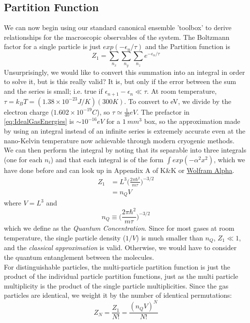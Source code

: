 \subsection{Partition Function}
We can now begin using our standard canonical ensemble 'toolbox' to derive relationships for the macroscopic observables of the system. The Boltzmann factor for a single particle is just $exp(-\epsilon_n/\tau)$ and the Partition function is
\begin{equation}
Z_1 = \sum_{n_x} \sum_{n_y} \sum_{n_z} e^{-\epsilon_n/\tau}
\end{equation}
Unsurprisingly, we would like to convert this summation into an integral in order to solve it, but is this really valid? It is, but only if the error between the sum and the series is small; i.e. true if $\epsilon_{n+1} - \epsilon_n \ll \tau$. 
At room temperature, $\tau = k_B T = (1.38 \times 10^{-23} J/K)(300 K)$. 
To convert to eV, we divide by the electron charge ($1.602 \times 10^{-19} C$), 
so $\tau \simeq \frac{1}{40} eV$. The
prefactor in \cref{eq:IdealGasEnergies} is $\sim 10^{-16} eV$ for a $1~mm^3$ box,
so the approximation made by using an integral instead of an infinite series is extremely accurate even at the nano-Kelvin temperature now achievable through modern cryogenic methods.\\

We can then perform the integral by noting that its separable into three integrals (one for each $n_i$) and that each integral is of the form $\int exp(-\alpha^2 x^2)$, which we have done before and can look up in Appendix A of K\&K or 
\href{http://www.wolframalpha.com/input/?i=integrate\%20exp(-a\%5E2\%20x\%5E2)\%20from\%20x\%3D0..infinity}{Wolfram Alpha}.
\begin{align}
Z_1 &= L^3 \bigg(\frac{2 \pi \hbar^2}{m \tau}\bigg)^{-3/2} \\
    &= n_Q V
\end{align}
where $V = L^3$ and 
\begin{equation}
n_Q \equiv \bigg(\frac{2 \pi \hbar^2}{m \tau}\bigg)^{-3/2}
\label{eq:QuantConc}
\end{equation} 
which we define as the \emph{Quantum Concentration}. Since 
for most gases at
room temperature, the single particle density ($1/V$) is much smaller than
$n_Q$, $Z_1 \ll 1$, and the \textit{classical approximation} is valid. Otherwise, we would have to consider the quantum entanglement between the molecules.\\

For distinguishable particles, the multi-particle partition function is just the product of the individual particle partition functions, just as the multi particle multiplicity is the product of the single particle multiplicities. Since the
gas particles are identical, we weight it by the number of identical permutations:
\begin{equation}
Z_N = \frac{Z_1}{N!} = \frac{(n_Q V)^N}{N!}
\label{eq:IdealGasZ}
\end{equation}




